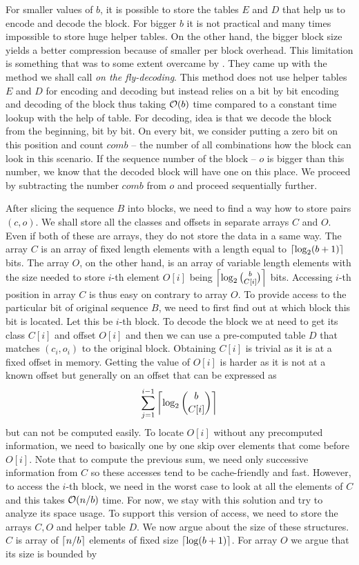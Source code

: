 For smaller values of $b$, it is possible to store the tables $E$ and $D$ that help us
to encode and decode the block. For bigger $b$ it is not practical and many times
impossible to store huge helper tables. On the other hand, the bigger block size yields a
better compression because of smaller per block overhead. This limitation is something that
was to some extent overcame by \cite{navarro2012fast}. They came up with the method we shall
call \textit{on the fly-decoding}. This method does not use helper tables $E$ and $D$ for
encoding and decoding but instead relies on a bit by bit encoding and decoding of the block
thus taking $\mathcal{O}(b)$ time compared to a constant time lookup with the help of table.
For decoding, idea is that we decode the block from the beginning, bit by bit. On every bit,
we consider putting a zero bit on this position and count $comb$ -- the number of all
combinations how the block can look in this scenario. If the sequence number of the block --
$o$ is bigger than this number, we know that the decoded block will have one on this place.
We proceed by subtracting the number $comb$ from $o$ and proceed sequentially further.

After slicing the sequence $B$ into blocks, we need to find a way how to store pairs $(c, o)$.
We shall store all the classes and offsets in separate arrays $C$ and $O$. Even if both of these
are arrays, they do not store the data in a same way. The array $C$ is an array of fixed length
elements with a length equal to $\left\lceil \log_2(b+1) \right\rceil$ bits. The array $O$, on the other hand, is
an array of variable length elements with the size needed to store $i$-th element $O[i]$ being
$\left\lceil \log_2{b\choose C[i]} \right\rceil$ bits. Accessing $i$-th position in array $C$ is thus easy on
contrary to array $O$. To provide access to the particular bit of original sequence $B$, we
need to first find out at which block this bit is located. Let this be $i$-th block. To decode
the block we at need to get its class $C[i]$ and offset $O[i]$ and then we can use a pre-computed
table $D$ that matches $(c_i, o_i)$ to the original block. Obtaining $C[i]$ is trivial as it is at
a fixed offset in memory. Getting the value of $O[i]$ is harder as it is not at a known offset but
generally on an offset that can be expressed as $$\sum_{j=1}^{i-1} \left\lceil \log_2{b\choose C[i]} \right\rceil$$ but
can not be computed easily. To locate $O[i]$ without any precomputed information, we need to basically
one by one skip over elements that come before $O[i]$. Note that to compute the previous sum, we need
only successive information from $C$ so these accesses tend to be cache-friendly and fast. However,
to access the $i$-th block, we need in the worst case to look at all the elements of $C$ and this
takes $\mathcal{O}(n/b)$ time. For now, we stay with this solution and try to analyze its space usage. To
support this version of access, we need to store the arrays $C, O$ and helper table $D$. We now
argue about the size of these structures. $C$ is array of $\left\lceil n/b \right\rceil$ elements of fixed size
$\left\lceil \log(b+1) \right\rceil$. For array $O$ we argue that its size is bounded by

